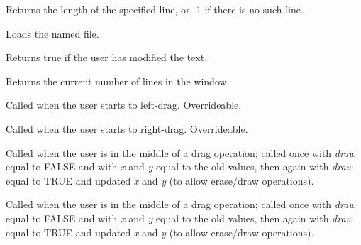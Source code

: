 Returns the length of the specified line, or -1 if there is no such
line.



Loads the named file.



Returns true if the user has modified the text.



Returns the current number of lines in the window.



Called when the user starts to left-drag. Overrideable.



Called when the user starts to right-drag. Overrideable.



Called when the user is in the middle of a drag operation; called once
with {\it draw} equal to FALSE and with {\it x} and {\it y} equal to
the old values, then again with {\it draw} equal to TRUE and updated
{\it x} and {\it y} (to allow erase/draw operations).



Called when the user is in the middle of a drag operation; called once
with {\it draw} equal to FALSE and with {\it x} and {\it y} equal to
the old values, then again with {\it draw} equal to TRUE and updated
{\it x} and {\it y} (to allow erase/draw operations).


